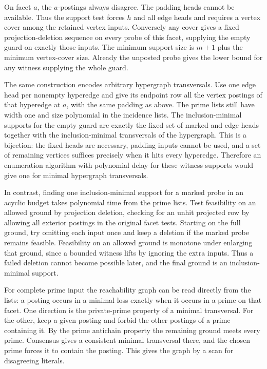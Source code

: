 On facet $a$, the $a$-postings always disagree.
The padding heads cannot be available. Thus
the support test forces $h$ and all edge
heads and requires a vertex cover among the
retained vertex inputs. Conversely any cover
gives a fixed projection-deletion sequence
on every probe of this facet, supplying the
empty guard on exactly those inputs. The
minimum support size is $m+1$ plus the
minimum vertex-cover size. Already the
unposted probe gives the lower bound for
any witness supplying the whole guard.

The same construction encodes arbitrary hypergraph
transversals. Use one edge head per nonempty
hyperedge and give its endpoint row all the vertex
postings of that hyperedge at $a$, with the same
padding as above. The prime lists still have width
one and size polynomial in the incidence lists.
The inclusion-minimal supports for the empty
guard are exactly the fixed set of marked and
edge heads together with the inclusion-minimal
transversals of the hypergraph. This is a
bijection: the fixed heads are necessary, padding
inputs cannot be used, and a set of remaining
vertices suffices precisely when it hits every
hyperedge. Therefore an enumeration algorithm with
polynomial delay for these witness supports would
give one for minimal hypergraph transversals.

In contrast, finding one inclusion-minimal support
for a marked probe in an acyclic budget takes
polynomial time from the prime lists. Test
feasibility on an allowed ground by projection
deletion, checking for an unhit projected row
by allowing all exterior postings in the original
facet tests. Starting on the full ground, try
omitting each input once and keep a deletion if
the marked probe remains feasible. Feasibility
on an allowed ground is monotone under enlarging
that ground, since a bounded witness lifts by
ignoring the extra inputs. Thus a failed deletion
cannot become possible later, and the final
ground is an inclusion-minimal support.

For complete prime input the reachability graph can
be read directly from the lists: a posting occurs
in a minimal loss exactly when it occurs in a prime
on that facet. One direction is the private-prime
property of a minimal transversal. For the other,
keep a given posting and forbid the other postings
of a prime containing it. By the prime antichain
property the remaining ground meets every prime.
Consensus gives a consistent minimal transversal
there, and the chosen prime forces it to contain
the posting. This gives the graph by a scan for
disagreeing literals.

